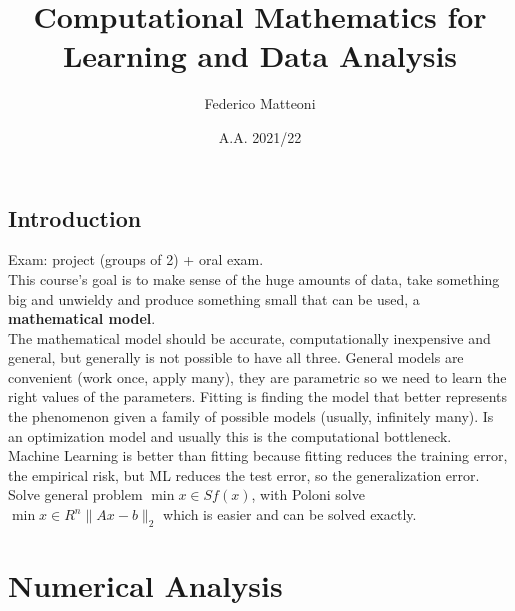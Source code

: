 \documentclass[10pt]{report}
\begin{document}
\title{Computational Mathematics for Learning and Data Analysis}
\author{Federico Matteoni}
\date{A.A. 2021/22}
\renewcommand*\contentsname{Index}

\maketitle
\begin{multicols}{2}
\tableofcontents
\end{multicols}
\pagebreak
\section{Introduction}
Exam: project (groups of 2) + oral exam.\\
This course's goal is to make sense of the huge amounts of data, take something big and unwieldy and produce something small that can be used, a \textbf{mathematical model}.\\
The mathematical model should be accurate, computationally inexpensive and general, but generally is not possible to have all three. General models are convenient (work once, apply many), they are parametric so we need to learn the right values of the parameters. Fitting is finding the model that better represents the phenomenon given a family of possible models (usually, infinitely many). Is an optimization model and usually this is the computational bottleneck.\\
Machine Learning is better than fitting because fitting reduces the training error, the empirical risk, but ML reduces the test error, so the generalization error.\\
Solve general problem $\min{x\in S}f(x)$, with Poloni solve $\min{x\in R^n}\|Ax - b\|_2$ which is easier and can be solved exactly.
\chapter{Numerical Analysis}
\end{document}
